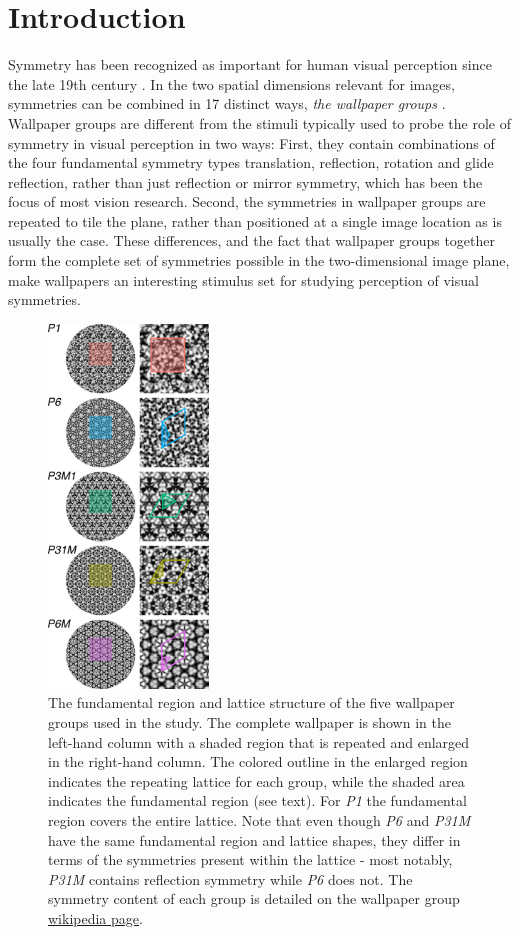 \documentclass[11pt, twoside]{article}
\begin{document}
\section*{Introduction}
Symmetry has been recognized as important for human visual perception since the late 19th century \citep{mach_1959}. In the two spatial dimensions relevant for images, symmetries can be combined in 17 distinct ways, \textit{the wallpaper groups} \citep{RN1562,RN1563,RN1425}. Wallpaper groups are different from the stimuli typically used to probe the role of symmetry in visual perception in two ways: First, they contain combinations of the four fundamental symmetry types translation, reflection, rotation and glide reflection, rather than just reflection or mirror symmetry, which has been the focus of most vision research. Second, the symmetries in wallpaper groups are repeated to tile the plane, rather than positioned at a single image location as is usually the case. These differences, and the fact that wallpaper groups together form the complete set of symmetries possible in the two-dimensional image plane, make wallpapers an interesting stimulus set for studying perception of visual symmetries.
\begin{figure}
	\centering
	\includegraphics[width=0.38\textwidth]{./figures/wpg_structure.pdf}
	\caption{The fundamental region and lattice structure of the five wallpaper groups used in the study. The complete wallpaper is shown in the left-hand column with a shaded region that is repeated and enlarged in the right-hand column. The colored outline in the enlarged region indicates the repeating lattice for each group, while the shaded area indicates the fundamental region (see text). For \textit{P1} the fundamental region covers the entire lattice. Note that even though \textit{P6} and \textit{P31M} have the same fundamental region and lattice shapes, they differ in terms of the symmetries present within the lattice - most notably, \textit{P31M} contains reflection symmetry while \textit{P6} does not. The symmetry content of each group is detailed on the wallpaper group \href{https://en.wikipedia.org/wiki/Wallpaper_group}{wikipedia page}.}
	\label{fig:wpg_structure}
\end{figure}
\end{document}
